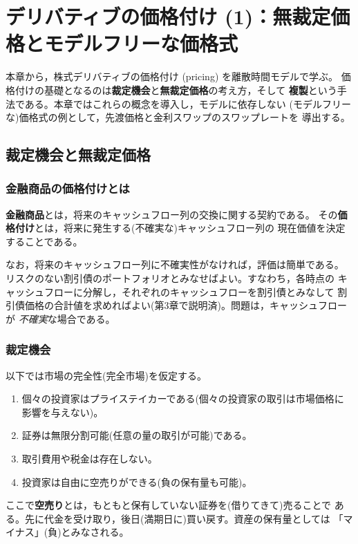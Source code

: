 \chapter{デリバティブの価格付け (1)：無裁定価格とモデルフリーな価格式}

本章から，株式デリバティブの価格付け (pricing) を離散時間モデルで学ぶ。
価格付けの基礎となるのは\textbf{裁定機会}と\textbf{無裁定価格}の考え方，そして
\textbf{複製}という手法である。本章ではこれらの概念を導入し，モデルに依存しない
(モデルフリーな)価格式の例として，先渡価格と金利スワップのスワップレートを
導出する。

\section{裁定機会と無裁定価格}

\subsection{金融商品の価格付けとは}

\textbf{金融商品}とは，将来のキャッシュフロー列の交換に関する契約である。
その\textbf{価格付け}とは，将来に発生する(不確実な)キャッシュフロー列の
現在価値を決定することである。

なお，将来のキャッシュフロー列に不確実性がなければ，評価は簡単である。
リスクのない割引債のポートフォリオとみなせばよい。すなわち，各時点の
キャッシュフローに分解し，それぞれのキャッシュフローを割引債とみなして
割引債価格の合計値を求めればよい(第3章で説明済)。問題は，キャッシュフローが
\emph{不確実}な場合である。

\subsection{裁定機会}

以下では市場の完全性(完全市場)を仮定する。

\begin{definition}[完全市場(再掲)]
\begin{enumerate}
\item[①] 個々の投資家はプライステイカーである(個々の投資家の取引は市場価格に
影響を与えない)。
\item[②] 証券は無限分割可能(任意の量の取引が可能)である。
\item[③] 取引費用や税金は存在しない。
\item[④] 投資家は自由に空売りができる(負の保有量も可能)。
\end{enumerate}
ここで\textbf{空売り}とは，もともと保有していない証券を(借りてきて)売ることで
ある。先に代金を受け取り，後日(満期日に)買い戻す。資産の保有量としては
「マイナス」(負)とみなされる。
\end{definition}

